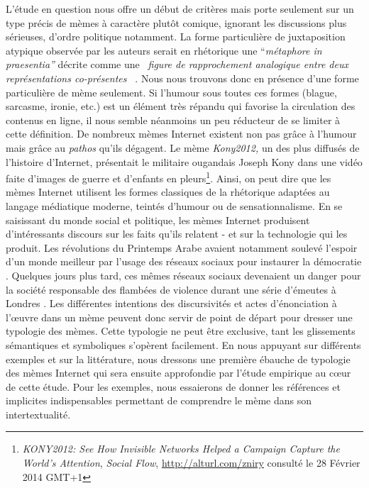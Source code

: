 L{\textquoteright}étude en question nous offre un début de critères mais porte seulement sur un type précis de mèmes à caractère plutôt comique, ignorant les discussions plus sérieuses, d{\textquoteright}ordre politique notamment. La forme particulière de juxtaposition atypique observée par les auteurs serait en rhétorique une {\textquotedblleft}\textit{métaphore in praesentia{\textquotedblright} }décrite comme une \textit{{\guillemotleft}~figure de rapprochement analogique entre deux représentations co-présentes~{\guillemotright}} \citep{Jenny2012}. Nous nous trouvons donc en présence d{\textquoteright}une forme particulière de mème seulement. Si l{\textquoteright}humour sous toutes ces formes (blague, sarcasme, ironie, etc.) est un élément très répandu qui favorise la circulation des contenus en ligne, il nous semble néanmoins un peu réducteur de se limiter à cette définition. De nombreux mèmes Internet existent non pas gr\^ace à l{\textquoteright}humour mais gr\^ace au \textit{pathos} qu{\textquoteright}ils dégagent. Le mème \textit{Kony2012, }un des plus diffusés de l{\textquoteright}histoire d{\textquoteright}Internet, présentait le militaire ougandais Joseph Kony dans une vidéo faite d{\textquoteright}images de guerre et d{\textquoteright}enfants en pleurs\footnote{ \textit{KONY2012: See How Invisible Networks Helped a Campaign Capture the World's Attention}, \textit{Social Flow}, \url{http://alturl.com/zniry} consulté le 28 Février 2014 GMT+1}. Ainsi, on peut dire que les mèmes Internet utilisent les formes classiques de la rhétorique adaptées au langage médiatique moderne, teintés d{\textquoteright}humour ou de sensationnalisme. En se saisissant du monde social et politique, les mèmes Internet produisent d{\textquoteright}intéressants discours sur les faits qu{\textquoteright}ils relatent - et sur la technologie qui les produit. Les révolutions du Printemps Arabe avaient notamment soulevé l{\textquoteright}espoir d{\textquoteright}un monde meilleur par l{\textquoteright}usage des réseaux sociaux pour instaurer la démocratie \citep{Lotan2011}. Quelques jours plus tard, ces mêmes réseaux sociaux devenaient un danger pour la société responsable des flambées de violence durant une série d{\textquoteright}émeutes à Londres \citep{Casilli2011}. Les différentes intentions des discursivités et actes d{\textquoteright}énonciation à l{\textquoteright}{\oe}uvre dans un mème peuvent donc servir de point de départ pour dresser une typologie des mèmes. Cette typologie ne peut être exclusive, tant les glissements sémantiques et symboliques s'opèrent facilement. En nous appuyant sur différents exemples et sur la littérature, nous dressons une première ébauche de typologie des mèmes Internet qui sera ensuite approfondie par l{\textquoteright}étude empirique au c{\oe}ur de cette étude. Pour les exemples, nous essaierons de donner les références et implicites indispensables permettant de comprendre le mème dans son intertextualité.

